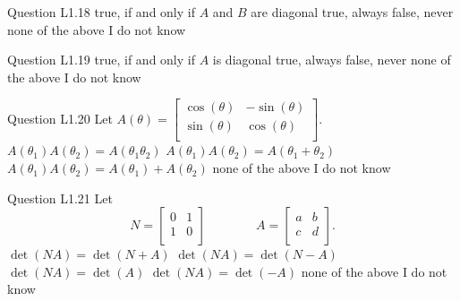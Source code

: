 \begin{frame}{Question L1.18}
	\QuestionNotes{}
	\QuestionAnswers
	{
		\answer true, if and only if $A$ and $B$ are diagonal
		\answer true, always
		\answer false, never
		\correctanswer none of the above
		\answer I do not know
	}
\end{frame}


\begin{frame}{Question L1.19}
	\QuestionNotes{}
	\QuestionAnswers
	{
		\answer true, if and only if $A$ is diagonal
		\correctanswer true, always
		\answer false, never
		\answer none of the above
		\answer I do not know
	}
\end{frame}


\begin{frame}{Question L1.20}
	\QuestionNotes{}
	\QuestionBody
	{
		Let
		$
		A(\theta)
		=
		\begin{bmatrix}
			\cos(\theta) & -\sin(\theta) \\
			\sin(\theta) & \cos(\theta) \\
		\end{bmatrix} .
		$
	}
	\QuestionAnswers
	{
		\answer $A(\theta_{1}) A(\theta_{2}) = A\left( \theta_{1} \theta_{2} \right)$
		\correctanswer $A(\theta_{1}) A(\theta_{2}) = A\left( \theta_{1} + \theta_{2} \right)$
		\answer $A(\theta_{1}) A(\theta_{2}) = A \left( \theta_{1} \right) + A \left( \theta_{2} \right)$
		\answer none of the above
		\answer I do not know
	}
\end{frame}


\begin{frame}{Question L1.21}
	\QuestionNotes{}
	\QuestionBody
	{
		Let
		$$
		N
		=
		\begin{bmatrix}
			0 & 1 \\
			1 & 0 \\
		\end{bmatrix}
		\qquad
		\qquad
		A
		=
		\begin{bmatrix}
			a & b \\
			c & d \\
		\end{bmatrix} .
		$$
	}
	\QuestionAnswers
	{
		\answer $\det \left( NA \right) = \det \left( N + A \right)$
		\answer $\det \left( NA \right) = \det \left( N - A \right)$
		\answer $\det \left( NA \right) = \det \left( A \right)$
		\correctanswer $\det \left( NA \right) = \det \left( - A \right)$
		\answer none of the above
		\answer I do not know
	}
\end{frame}


